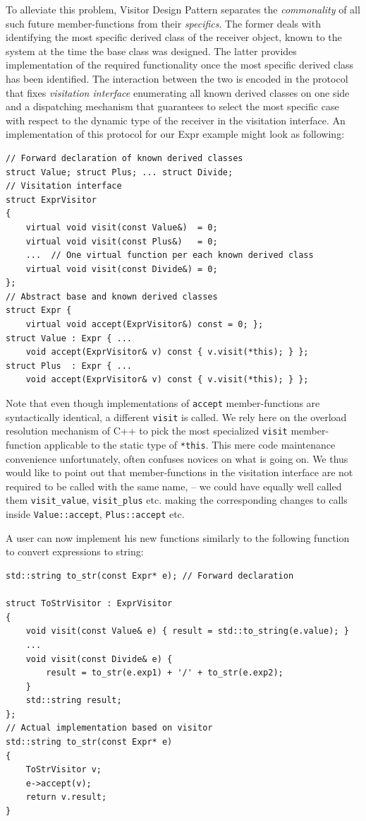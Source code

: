 \documentclass[preprint]{sigplanconf}
\makeatletter
\DeclareRobustCommand{\code}[1]{{\lstinline[breaklines=false,escapechar=@]{#1}}}
\makeatother
\begin{document}
To alleviate this problem, Visitor Design Pattern separates the 
\emph{commonality} of all such future member-functions from their 
\emph{specifics}. The former deals with identifying the most specific derived 
class of the receiver object, known to the system at the time the base class was 
designed. The latter provides implementation of the required functionality once 
the most specific derived class has been identified. The interaction between the 
two is encoded in the protocol that fixes \emph{visitation interface} 
enumerating all known derived classes on one side and a dispatching mechanism 
that guarantees to select the most specific case with respect to the dynamic 
type of the receiver in the visitation interface. An implementation of this 
protocol for our Expr example might look as following:

\begin{lstlisting}
// Forward declaration of known derived classes
struct Value; struct Plus; ... struct Divide;
// Visitation interface
struct ExprVisitor
{
    virtual void visit(const Value&)  = 0;
    virtual void visit(const Plus&)   = 0;
    ...  // One virtual function per each known derived class
    virtual void visit(const Divide&) = 0;
};
// Abstract base and known derived classes
struct Expr { 
    virtual void accept(ExprVisitor&) const = 0; };
struct Value : Expr { ...
    void accept(ExprVisitor& v) const { v.visit(*this); } };
struct Plus  : Expr { ...
    void accept(ExprVisitor& v) const { v.visit(*this); } };
\end{lstlisting}

Note that even though implementations of \code{accept} member-functions are 
syntactically identical, a different \code{visit} is called. We rely here on the 
overload resolution mechanism of C++ to pick the most specialized \code{visit} 
member-function applicable to the static type of \code{*this}. This mere code 
maintenance convenience unfortunately, often confuses novices on what 
is going on. We thus would like to point out that member-functions in the 
visitation interface are not required to be called with the same name, -- we 
could have equally well called them \code{visit_value}, \code{visit_plus} etc. 
making the corresponding changes to calls inside \code{Value::accept}, 
\code{Plus::accept} etc.

A user can now implement his new functions similarly to the following function 
to convert expressions to string:

\begin{lstlisting}
std::string to_str(const Expr* e); // Forward declaration

struct ToStrVisitor : ExprVisitor
{
    void visit(const Value& e) { result = std::to_string(e.value); }
    ...
    void visit(const Divide& e) { 
        result = to_str(e.exp1) + '/' + to_str(e.exp2); 
    }
    std::string result;
};
// Actual implementation based on visitor
std::string to_str(const Expr* e)
{
    ToStrVisitor v;
    e->accept(v);
    return v.result;
}
\end{lstlisting}
\end{document}
